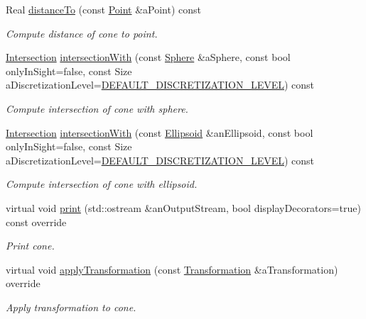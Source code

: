 \begin{DoxyCompactItemize}
Real \hyperlink{classostk_1_1math_1_1geom_1_1d3_1_1objects_1_1_cone_acc52be69d703991cdda1debcb9f11ec9}{distance\+To} (const \hyperlink{classostk_1_1math_1_1geom_1_1d3_1_1objects_1_1_point}{Point} \&a\+Point) const
\begin{DoxyCompactList}\small\item\em Compute distance of cone to point. \end{DoxyCompactList}\item 
\hyperlink{classostk_1_1math_1_1geom_1_1d3_1_1_intersection}{Intersection} \hyperlink{classostk_1_1math_1_1geom_1_1d3_1_1objects_1_1_cone_a28ee89d65bf8a7d03b28c48af68243ad}{intersection\+With} (const \hyperlink{classostk_1_1math_1_1geom_1_1d3_1_1objects_1_1_sphere}{Sphere} \&a\+Sphere, const bool only\+In\+Sight=false, const Size a\+Discretization\+Level=\hyperlink{_pyramid_8hpp_a3eb9931e85ba4c9718113211e549e91d}{D\+E\+F\+A\+U\+L\+T\+\_\+\+D\+I\+S\+C\+R\+E\+T\+I\+Z\+A\+T\+I\+O\+N\+\_\+\+L\+E\+V\+EL}) const
\begin{DoxyCompactList}\small\item\em Compute intersection of cone with sphere. \end{DoxyCompactList}\item 
\hyperlink{classostk_1_1math_1_1geom_1_1d3_1_1_intersection}{Intersection} \hyperlink{classostk_1_1math_1_1geom_1_1d3_1_1objects_1_1_cone_ac47f327abb71af922d824beca7af0c62}{intersection\+With} (const \hyperlink{classostk_1_1math_1_1geom_1_1d3_1_1objects_1_1_ellipsoid}{Ellipsoid} \&an\+Ellipsoid, const bool only\+In\+Sight=false, const Size a\+Discretization\+Level=\hyperlink{_pyramid_8hpp_a3eb9931e85ba4c9718113211e549e91d}{D\+E\+F\+A\+U\+L\+T\+\_\+\+D\+I\+S\+C\+R\+E\+T\+I\+Z\+A\+T\+I\+O\+N\+\_\+\+L\+E\+V\+EL}) const
\begin{DoxyCompactList}\small\item\em Compute intersection of cone with ellipsoid. \end{DoxyCompactList}\item 
virtual void \hyperlink{classostk_1_1math_1_1geom_1_1d3_1_1objects_1_1_cone_a511e3f582e15b11f9b571ec199fdf707}{print} (std\+::ostream \&an\+Output\+Stream, bool display\+Decorators=true) const override
\begin{DoxyCompactList}\small\item\em Print cone. \end{DoxyCompactList}\item 
virtual void \hyperlink{classostk_1_1math_1_1geom_1_1d3_1_1objects_1_1_cone_a9b783e16344d65dfba68c63d1adca3e1}{apply\+Transformation} (const \hyperlink{classostk_1_1math_1_1geom_1_1d3_1_1_transformation}{Transformation} \&a\+Transformation) override
\begin{DoxyCompactList}\small\item\em Apply transformation to cone. \end{DoxyCompactList}\end{DoxyCompactItemize}
